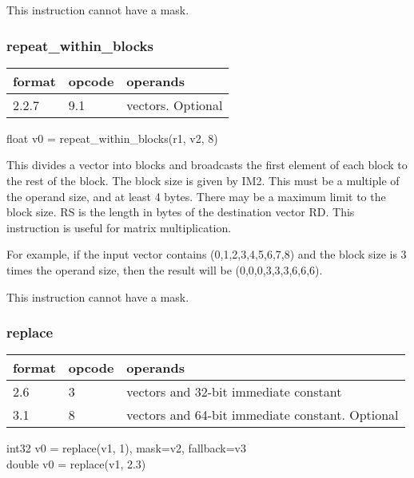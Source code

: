 \documentclass[forwardcom.tex]{subfiles}
\begin{document}
This instruction cannot have a mask.

\subsubsection{repeat\_within\_blocks}
\label{table:repeatWithinBlockInstruction}
\begin{tabular}{|p{12mm}|p{12mm}|p{110mm}|}
\hline
\bfseries format & \bfseries opcode & \bfseries operands \\ \hline
2.2.7 & 9.1 & vectors. Optional \\ \hline
\end{tabular}
\vspace{2mm}

float v0 = repeat\_within\_blocks(r1, v2, 8) 
\vspace{2mm}

This divides a vector into blocks and broadcasts the first element of each block to the rest of the block. The block size is given by IM2. This must be a multiple of the operand size, and at least 4 bytes. There may be a maximum limit to the block size. RS is the length in bytes of the destination vector RD. This instruction is useful for matrix multiplication.
\vspace{2mm}

For example, if the input vector contains (0,1,2,3,4,5,6,7,8) and the block size is 3 times the operand size, then the result will be (0,0,0,3,3,3,6,6,6).
\vspace{2mm}

This instruction cannot have a mask.

\subsubsection{replace}
\label{table:replaceInstruction}
\begin{tabular}{|p{12mm}|p{12mm}|p{110mm}|}
\hline
\bfseries format & \bfseries opcode & \bfseries operands \\ \hline
2.6 & 3 & vectors and 32-bit immediate constant \\ \hline
3.1 & 8 & vectors and 64-bit immediate constant. Optional \\ \hline
\end{tabular}
\vspace{2mm}

int32 v0 = replace(v1, 1), mask=v2, fallback=v3\\
double v0 = replace(v1, 2.3)
\vspace{2mm}
\end{document}
